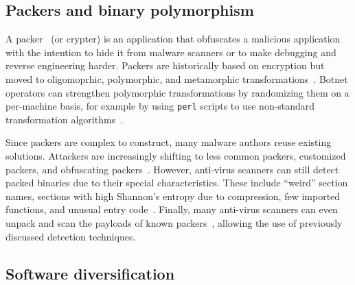 \documentclass[letterpaper,twocolumn,10pt]{article}
\begin{document}
\subsection{Packers and binary polymorphism}\label{sec:packers}

A packer~\cite{kang07worm, martignoni07acsac, oberheide09woot, royal06acsac,
perdisci08patternrec} (or crypter) is an application that obfuscates a malicious
application with the intention to hide it from malware scanners or to make
debugging and reverse engineering harder. Packers are historically based on
encryption but moved to oligomoprhic, polymorphic, and metamorphic
transformations~\cite{szor.ferrie+01, okane.etal+11}. Botnet operators can
strengthen polymorphic transformations by randomizing them on a per-machine
basis, for example by using \texttt{perl} scripts to use non-standard
transformation algorithms~\cite{botnetop12}.

Since packers are complex to construct, many malware authors reuse existing
solutions.  Attackers are increasingly shifting to less common packers,
customized packers, and obfuscating packers~\cite{pandasecurity}.  However,
anti-virus scanners can still detect packed binaries due to their special
characteristics.  These include ``weird'' section names, sections with high
Shannon's entropy due to compression, few imported functions, and unusual entry
code~\cite{fsecure, perdisci08patternrec}.  Finally, many anti-virus scanners can even unpack and scan
the payloads of known packers~\cite{kang07worm, martignoni07acsac,
  royal06acsac}, allowing the use of previously discussed detection
techniques.



\subsection{Software diversification}\label{sec:software-diversification}
\end{document}
